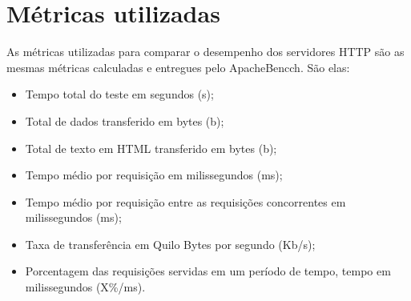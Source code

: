 \section{Métricas utilizadas}
As métricas utilizadas para comparar o desempenho dos servidores HTTP são as 
mesmas métricas calculadas e entregues pelo ApacheBencch. São elas:
\begin{itemize}
	\item Tempo total do teste em segundos (s);
	\item Total de dados transferido em bytes (b);
	\item Total de texto em HTML transferido em bytes (b);
	\item Tempo médio por requisição em milissegundos (ms);
	\item Tempo médio por requisição entre as requisições concorrentes em 
	milissegundos (ms);
	\item Taxa de transferência em Quilo Bytes por segundo (Kb/s);
	\item Porcentagem das requisições servidas em um período de tempo, tempo em 
	milissegundos (X\%/ms).
\end{itemize}